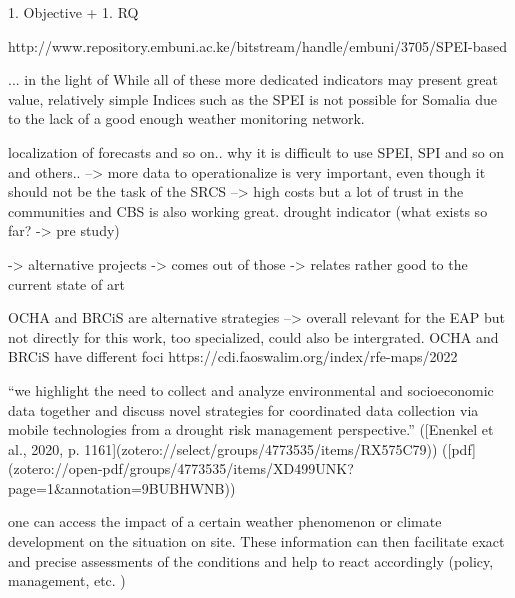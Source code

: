 1. Objective + 1. RQ




http://www.repository.embuni.ac.ke/bitstream/handle/embuni/3705/SPEI-based%

... in the light of
While all of these more dedicated indicators may present great value, relatively simple Indices such as the SPEI is not possible for Somalia due to the lack of a good enough weather monitoring network. 


localization of forecasts and so on.. why it is difficult to use SPEI, SPI and so on and others.. --> more data to operationalize is very important, even though it should not be the task of the SRCS --> high costs but a lot of trust in the communities and CBS is also working great.
drought indicator (what exists so far? -> pre study)

-> alternative projects
-> comes out of those -> relates rather good to the current state of art


OCHA and BRCiS are alternative strategies --> overall relevant for the EAP but not directly for this work, too specialized, could also be intergrated. OCHA and BRCiS have different foci
https://cdi.faoswalim.org/index/rfe-maps/2022

“we highlight the need to collect and analyze environmental and socioeconomic data together and discuss novel strategies for coordinated data collection via mobile technologies from a drought risk management perspective.” ([Enenkel et al., 2020, p. 1161](zotero://select/groups/4773535/items/RX575C79)) ([pdf](zotero://open-pdf/groups/4773535/items/XD499UNK?page=1&annotation=9BUBHWNB))

one can access the impact of a certain weather phenomenon or climate development on the situation on site. These information can then facilitate exact and precise assessments of the conditions and help to react accordingly (policy, management, etc. ) 

